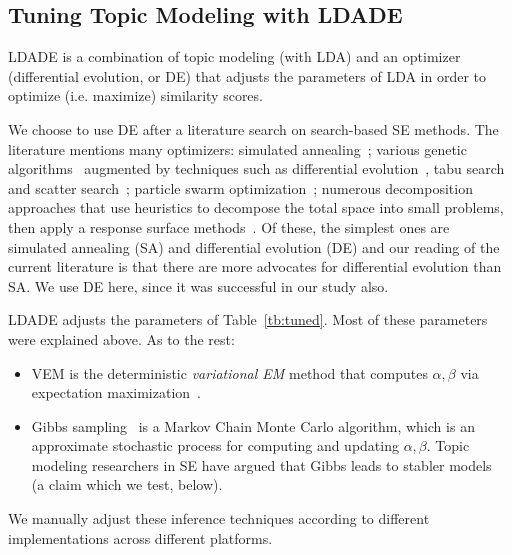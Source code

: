 \documentclass[10pt,conference]{IEEEtran}
\newcommand{\bi}{\begin{itemize}}
\newcommand{\ei}{\end{itemize}}
\theoremstyle{break}
\begin{document}
\subsection{Tuning Topic Modeling with LDADE}
\label{sect: tuning}
LDADE is a combination of topic modeling (with LDA) and an optimizer (differential evolution, or DE) that adjusts
the parameters of LDA in order to optimize (i.e. maximize) similarity scores.

We choose to use DE after a literature search on search-based SE methods.
The literature mentions many optimizers: simulated
annealing~\cite{feather2002converging, menzies2007business}; various genetic
algorithms~\cite{goldberg1979complexity} augmented by techniques such as
differential evolution~\cite{storn1997differential}, tabu search and scatter
search~\cite{glover1986general, beausoleil2006moss, molina2007sspmo,
  nebro2008abyss}; particle swarm optimization~\cite{pan2008particle}; numerous
decomposition approaches that use heuristics to decompose the total space into
small problems, then apply a response surface methods~\cite{krall2015gale,
  zuluaga2013active}. Of these, the simplest ones are simulated annealing (SA)
and differential evolution (DE) and  our reading of the current literature is
that there are more advocates for differential evolution than SA. We use DE here, since it was successful in our study also.

LDADE  adjusts the parameters of
Table~\ref{tb:tuned}. Most of these parameters were explained above. As to the rest:
\bi
\item VEM is the deterministic {\em variational EM} method that computes $\alpha,\beta$ via
  expectation maximization~\cite{minka2002expectation}.
\item Gibbs sampling~\cite{wei2006lda, griffiths2004finding} is a Markov Chain Monte Carlo algorithm, which is an approximate stochastic process for computing and updating $\alpha,\beta$.
  Topic modeling researchers in SE have argued that Gibbs leads to stabler models~\cite{layman16a,layman2016topic} (a claim which we test, below).
  \ei

We manually adjust these inference techniques according to different implementations across different platforms.
\end{document}
